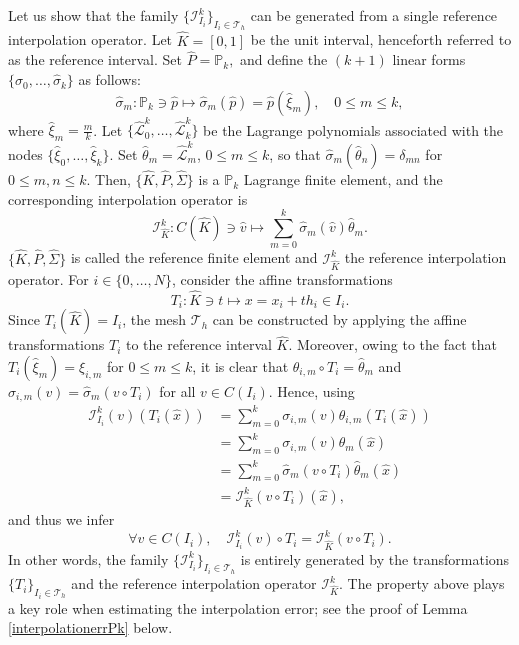 \documentclass{article}
\begin{document}
Let us show that the family $\{\mathcal{I}_{I_i}^k\}_{I_i \in \mathcal{T}_h}$ can be generated from a single reference interpolation operator. Let $\hat{K} = [0, 1]$ be the unit interval, henceforth referred to as the reference interval. Set $\hat{P} = \mathbb{P}_k,$ and define the $(k+1)$ linear forms $\{\hat{\sigma}_0, \dots, \hat{\sigma}_k\}$ as follows:
$$ \hat{\sigma}_m: \mathbb{P}_k \ni \hat{p} \mapsto \hat{\sigma}_m(\hat{p}) = \hat{p}(\hat{\xi}_m), \quad 0 \le m \le k, $$
where $\hat{\xi}_m = \frac{m}{k}$. Let $\{\hat{\mathcal{L}}_0^k, \dots, \hat{\mathcal{L}}_k^k\}$ be the Lagrange polynomials associated with the nodes $\{\hat{\xi}_0, \dots, \hat{\xi}_k\}$. Set $\hat{\theta}_m = \hat{\mathcal{L}}_m^k$, $0 \le m \le k$, so that $\hat{\sigma}_m(\hat{\theta}_n) = \delta_{mn}$ for $0 \le m,n \le k$. Then, $\{\hat{K}, \hat{P}, \hat{\Sigma}\}$ is a $\mathbb{P}_k$ Lagrange finite element, and the corresponding interpolation operator is
$$ \mathcal{I}_{\hat{K}}^k: C(\hat{K}) \ni \hat{v} \mapsto \sum_{m=0}^k \hat{\sigma}_m(\hat{v}) \hat{\theta}_m. $$
$\{\hat{K}, \hat{P}, \hat{\Sigma}\}$ is called the reference finite element and $\mathcal{I}_{\hat{K}}^k$ the reference interpolation operator. For $i \in \{0, \dots, N\}$, consider the affine transformations
$$ T_i: \hat{K} \ni t \mapsto x = x_i + th_i \in I_i. $$
Since $T_i(\hat{K}) = I_i$, the mesh $\mathcal{T}_h$ can be constructed by applying the affine transformations $T_i$ to the reference interval $\hat{K}$. Moreover, owing to the fact that $T_i(\hat{\xi}_m) = \xi_{i,m}$ for $0 \le m \le k$, it is clear that $\theta_{i,m} \circ T_i = \hat{\theta}_m$ and $\sigma_{i,m}(v) = \hat{\sigma}_m(v \circ T_i)$ for all $v \in C(I_i)$. Hence, using
\begin{align*}
    \mathcal{I}_{I_i}^k(v)(T_i(\hat{x})) &= \sum_{m=0}^k \sigma_{i,m}(v) \theta_{i,m}(T_i(\hat{x})) \\
    &= \sum_{m=0}^k \sigma_{i,m}(v) \hat{\theta}_m(\hat{x}) \\
    &= \sum_{m=0}^k \hat{\sigma}_m(v \circ T_i) \hat{\theta}_m(\hat{x})\\
    & = \mathcal{I}_{\hat{K}}^k(v \circ T_i)(\hat{x}),
\end{align*}
and thus we infer
$$ \forall v \in C(I_i), \quad \mathcal{I}_{I_i}^k(v) \circ T_i = \mathcal{I}_{\hat{K}}^k(v \circ T_i). $$
In other words, the family $\{\mathcal{I}_{I_i}^k\}_{I_i \in \mathcal{T}_h}$ is entirely generated by the transformations $\{T_i\}_{I_i \in \mathcal{T}_h}$ and the reference interpolation operator $\mathcal{I}_{\hat{K}}^k$. The property above plays a key role when estimating the interpolation error; see the proof of Lemma \ref{interpolationerrPk} below.
\end{document}
